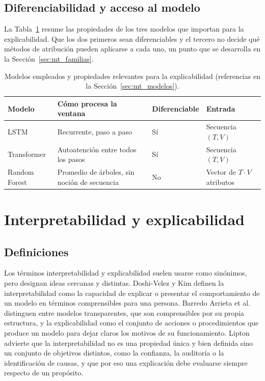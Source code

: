 \subsection{Diferenciabilidad y acceso al modelo}

La Tabla~\ref{tab:mt_modelos} resume las propiedades de los tres modelos que importan para la explicabilidad. Que los dos primeros sean diferenciables y el tercero no decide qué métodos de atribución pueden aplicarse a cada uno, un punto que se desarrolla en la Sección~\ref{sec:mt_familias}.

\begin{table}[h!]
\centering
\small
\renewcommand{\arraystretch}{1.25}
\begin{tabular}{|>{\raggedright\arraybackslash}p{2.9cm}|>{\raggedright\arraybackslash}p{4.3cm}|>{\centering\arraybackslash}p{2.6cm}|>{\raggedright\arraybackslash}p{2.8cm}|}
\hline
\textbf{Modelo} & \textbf{Cómo procesa la ventana} & \textbf{Diferenciable} & \textbf{Entrada} \\ \hline
LSTM & Recurrente, paso a paso & Sí & Secuencia $(T,V)$ \\ \hline
Transformer & Autoatención entre todos los pasos & Sí & Secuencia $(T,V)$ \\ \hline
Random Forest & Promedio de árboles, sin noción de secuencia & No & Vector de $T\cdot V$ atributos \\ \hline
\end{tabular}
\caption{Modelos empleados y propiedades relevantes para la explicabilidad (referencias en la Sección~\ref{sec:mt_modelos}).}
\label{tab:mt_modelos}
\end{table}

\section{Interpretabilidad y explicabilidad}
\label{sec:mt_interpretabilidad}

\subsection{Definiciones}

Los términos interpretabilidad y explicabilidad suelen usarse como sinónimos, pero designan ideas cercanas y distintas. Doshi-Velez y Kim \cite{doshivelez2017} definen la interpretabilidad como la capacidad de explicar o presentar el comportamiento de un modelo en términos comprensibles para una persona. Barredo Arrieta et al.\ \cite{arrieta2020} distinguen entre modelos transparentes, que son comprensibles por su propia estructura, y la explicabilidad como el conjunto de acciones o procedimientos que produce un modelo para dejar claros los motivos de su funcionamiento. Lipton \cite{lipton2018} advierte que la interpretabilidad no es una propiedad única y bien definida sino un conjunto de objetivos distintos, como la confianza, la auditoría o la identificación de causas, y que por eso una explicación debe evaluarse siempre respecto de un propósito.

